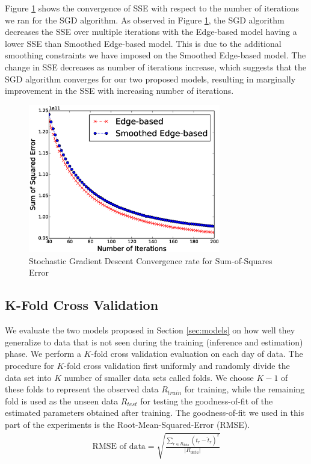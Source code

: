 \documentclass[conference]{IEEEtran.1.8}
\begin{document}
Figure \ref{fig:convergence} shows the convergence of SSE with respect to the number of iterations we ran for the SGD algorithm. %
As observed in Figure \ref{fig:convergence}, the SGD algorithm decreases the SSE over multiple iterations with the Edge-based model having a lower SSE than Smoothed Edge-based model. This is due to the additional smoothing constraints we have imposed on the Smoothed Edge-based model. The change in SSE decreases as number of iterations increase, which suggests that the SGD algorithm converges for our two proposed models, resulting in marginally improvement in the SSE with increasing number of iterations.
\begin{figure}[htb]
	\centering
	\includegraphics[width=3.3in]{convergence}
	\caption{Stochastic Gradient Descent Convergence rate for Sum-of-Squares Error}
	\label{fig:convergence}
\end{figure}

\subsection{K-Fold Cross Validation}

We evaluate the two models proposed in Section \ref{sec:models} on how well they generalize to data that is not seen during the training (inference and estimation) phase. We perform a $K$-fold cross validation evaluation on each day of data. The procedure for $K$-fold cross validation first uniformly and randomly divide the data set into $K$ number of smaller data sets called folds. We choose $K-1$ of these folds to represent the observed data $R_{train}$ for training, while the remaining fold is used as the unseen data $R_{test}$ for testing the goodness-of-fit of the estimated parameters obtained after training. The goodness-of-fit we used in this part of the experiments is the Root-Mean-Squared-Error (RMSE).
\begin{align*}
	\text{RMSE of data} = \sqrt{\frac{\sum_{r \in R_{data}} (t_r - \hat{t}_r)^2}{|R_{data}|}}
\end{align*}
\end{document}
